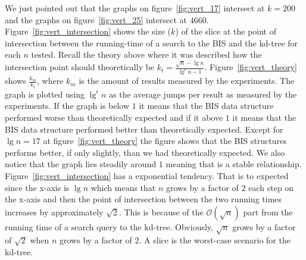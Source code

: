 \clearpage


We just pointed out that the graphs on figure~\ref{fig:vert_17} intersect at $k = 200$ and the graphs on  figure~\ref{fig:vert_25} intersect at $4660$. Figure~\ref{fig:vert_intersection} shows the size ($k$) of the slice at the point of intersection between the running-time of a search to the BIS and the kd-tree for each $n$ tested. Recall the theory above where it was described how the intersection point should theoretically be $k_t = \frac{\sqrt{n} - \lg n}{\lg^\epsilon n - 1}$. Figure~\ref{fig:vert_theory} shows $\frac{k_m}{k_t}$, where $k_m$ is the amount of results measured by the experiments. The graph is plotted using $\lg^\epsilon n$ as the average jumps per result as measured by the experiments. If the graph is below $1$ it means that the BIS data structure performed worse than theoretically expected and if it above $1$ it means that the BIS data structure performed better than theoretically expected. Except for $\lg n = 17$ at figure~\ref{fig:vert_theory} the figure shows that the BIS structures performs better, if only slightly, than we had theoretically expected. We also notice that the graph lies steadily around $1$ meaning that is a stable relationship. Figure~\ref{fig:vert_intersection} has a exponential tendency. That is to expected since the x-axis is $\lg n$ which means that $n$ grows by a factor of $2$ each step on the x-axis and then the point of intersection between the two running times increases by approximately $\sqrt{2}$. This is because of the $\mathcal{O}(\sqrt{n})$ part from the running time of a search query to the kd-tree. Obviously, $\sqrt{n}$ grows by a factor of $\sqrt{2}$ when $n$ grows by a factor of $2$. A slice is the worst-case scenario for the kd-tree.

